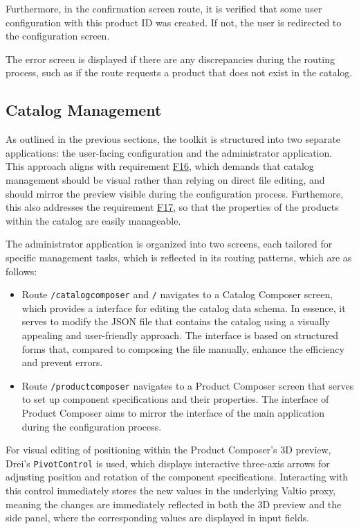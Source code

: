 Furthermore, in the confirmation screen route, it is verified that some user configuration with this product ID was created. If not, the user is redirected to the configuration screen. 

The error screen is displayed if there are any discrepancies during the routing process, such as if the route requests a product that does not exist in the catalog.


\subsection{Catalog Management} \label{section:catalog-management}

As outlined in the previous sections, the toolkit is structured into two separate applications: the user-facing configuration and the administrator application. This approach aligns with requirement \hyperref[itm:F16]{F16}, which demands that catalog management should be visual rather than relying on direct file editing, and should mirror the preview visible during the configuration process. Furthemore, this also addresses the requirement \hyperref[itm:F17]{F17}, so that the properties of the products within the catalog are easily manageable.

The administrator application is organized into two screens, each tailored for specific management tasks, which is reflected in its routing patterns, which are as follows:
\begin{itemize}[label=\rectanglebullet]
    \item Route \texttt{/catalogcomposer} and \texttt{/} navigates to a Catalog Composer screen, which provides a interface for editing the catalog data schema. In essence, it serves to modify the JSON file that contains the catalog using a visually appealing and user-friendly approach. The interface is based on structured forms that, compared to composing the file manually, enhance the efficiency and prevent errors. 
    
    \item Route \texttt{/productcomposer} navigates to a Product Composer screen that serves to set up component specifications and their properties. The interface of Product Composer aims to mirror the interface of the main application during the configuration process.
\end{itemize} 
    
For visual editing of positioning within the Product Composer's 3D preview, Drei's \texttt{PivotControl} is used, which displays interactive three-axis arrows for adjusting position and rotation of the component specifications. Interacting with this control immediately stores the new values in the underlying Valtio proxy, meaning the changes are immediately reflected in both the 3D preview and the side panel, where the corresponding values are displayed in input fields. 

